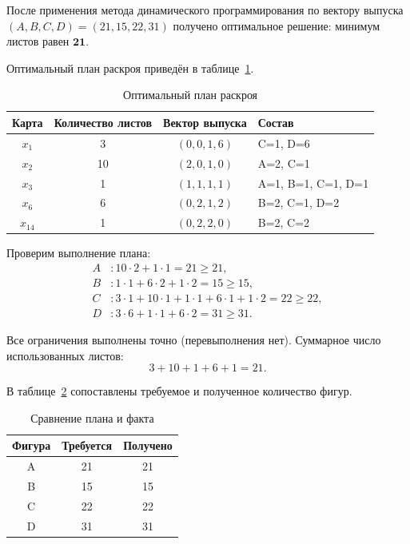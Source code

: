 После применения метода динамического программирования по вектору выпуска
$(A, B, C, D) = (21, 15, 22, 31)$ получено оптимальное решение:
минимум листов равен $\mathbf{21}$.

Оптимальный план раскроя приведён в таблице~\ref{tab:plan}.

\begin{table}[h!]
\centering
\caption{Оптимальный план раскроя}
\label{tab:plan}
\begin{tabular}{|c|c|c|l|}
\hline
Карта & Количество листов & Вектор выпуска & Состав \\
\hline
$x_1$    & 3  & $(0, 0, 1, 6)$ & C=1, D=6 \\
\hline
$x_2$    & 10 & $(2, 0, 1, 0)$ & A=2, C=1 \\
\hline
$x_3$    & 1  & $(1, 1, 1, 1)$ & A=1, B=1, C=1, D=1 \\
\hline
$x_6$    & 6  & $(0, 2, 1, 2)$ & B=2, C=1, D=2 \\
\hline
$x_{14}$ & 1  & $(0, 2, 2, 0)$ & B=2, C=2 \\
\hline
\end{tabular}
\end{table}

Проверим выполнение плана:
\begin{align*}
A &: 10 \cdot 2 + 1 \cdot 1 = 21 \ge 21, \\
B &: 1 \cdot 1 + 6 \cdot 2 + 1 \cdot 2 = 15 \ge 15, \\
C &: 3 \cdot 1 + 10 \cdot 1 + 1 \cdot 1 + 6 \cdot 1 + 1 \cdot 2 = 22 \ge 22, \\
D &: 3 \cdot 6 + 1 \cdot 1 + 6 \cdot 2 = 31 \ge 31.
\end{align*}

Все ограничения выполнены точно (перевыполнения нет). Суммарное число
использованных листов:
\[
3 + 10 + 1 + 6 + 1 = 21.
\]


В таблице~\ref{tab:result} сопоставлены требуемое и полученное количество
фигур.

\begin{table}[h!]
\centering
\caption{Сравнение плана и факта}
\label{tab:result}
\begin{tabular}{|c|c|c|}
\hline
Фигура & Требуется & Получено \\
\hline
A & 21 & 21 \\
\hline
B & 15 & 15 \\
\hline
C & 22 & 22 \\
\hline
D & 31 & 31 \\
\hline
\end{tabular}
\end{table}



